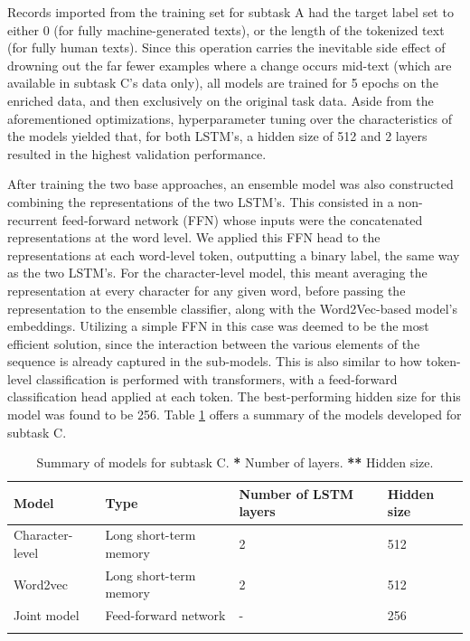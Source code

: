 Records imported from the training set for subtask A had the target label set to either 0 (for fully machine-generated texts), or the length of the tokenized text (for fully human texts).
Since this operation carries the inevitable side effect of drowning out the far fewer examples where a change occurs mid-text (which are available in subtask C's data only), all models are trained for 5 epochs on the enriched data, and then exclusively on the original task data.
Aside from the aforementioned optimizations, hyperparameter tuning over the characteristics of the models yielded that, for both LSTM's, a hidden size of 512 and 2 layers resulted in the highest validation performance.

After training the two base approaches, an ensemble model was also constructed combining the representations of the two LSTM's.
This consisted in a non-recurrent feed-forward network (FFN) whose inputs were the concatenated representations at the word level.
We applied this FFN head to the representations at each word-level token, outputting a binary label, the same way as the two LSTM's.
For the character-level model, this meant averaging the representation at every character for any given word, before passing the representation to the ensemble classifier, along with the Word2Vec-based model's embeddings.
Utilizing a simple FFN in this case was deemed to be the most efficient solution, since the interaction between the various elements of the sequence is already captured in the sub-models.
This is also similar to how token-level classification is performed with transformers, with a feed-forward classification head applied at each token.
The best-performing hidden size for this model was found to be 256.
Table \ref{tab:c_models} offers a summary of the models developed for subtask C.

\begin{table}[ht]
    \centering
    \begin{tabular}{llll}
        \hline
        \textbf{Model}  & \textbf{Type}          & \textbf{Number of LSTM layers} & \textbf{Hidden size} \\
        \hline
        Character-level & Long short-term memory & 2                              & 512                  \\
        Word2vec        & Long short-term memory & 2                              & 512                  \\
        Joint model     & Feed-forward network   & -                              & 256                  \\
        \hline
        \vspace{0.1cm}
    \end{tabular}
    \caption{Summary of models for subtask C. \textbf{*} Number of layers. \textbf{**} Hidden size.}
    \label{tab:c_models}
\end{table}



